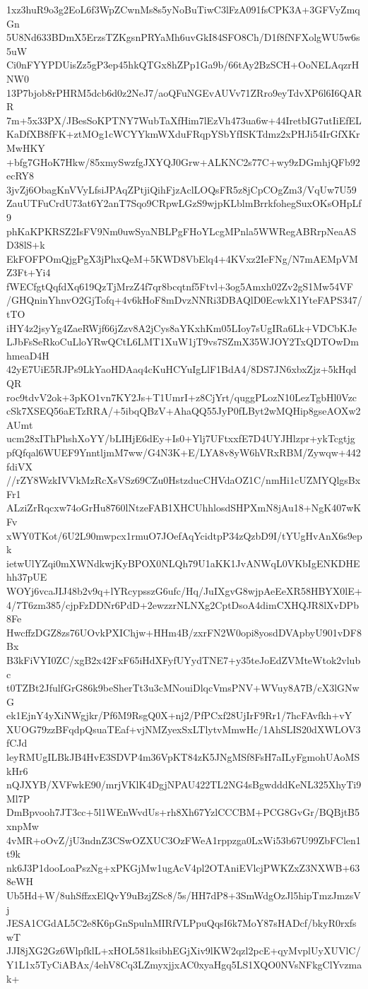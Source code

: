 1xz3huR9o3g2EoL6f3WpZCwnMs8s5yNoBuTiwC3lFzA091fsCPK3A+3GFVyZmqGn
5U8Nd633BDmX5ErzsTZKgsnPRYaMh6uvGkI84SFO8Ch/D1f8fNFXolgWU5w6s5uW
Ci0nFYYPDUisZz5gP3ep45hkQTGx8hZPp1Ga9b/66tAy2BzSCH+OoNELAqzrHNW0
13P7bjob8rPHRM5dcb6d0z2NeJ7/aoQFuNGEvAUVv71ZRro9eyTdvXP6l6I6QARR
7m+5x33PX/JBesSoKPTNY7WubTaXfHim7lEzVh473ua6w+44IretbIG7utIiEfEL
KaDfXB8fFK+ztMOg1cWCYYkmWXduFRqpYSbYfISKTdmz2xPHJi54IrGfXKrMwHKY
+bfg7GHoK7Hkw/85xmySwzfgJXYQJ0Grw+ALKNC2s77C+wy9zDGmhjQFb92ecRY8
3jvZj6ObagKnVVyLfsiJPAqZPtjiQihFjzAclLOQsFR5z8jCpCOgZm3/VqUw7U59
ZauUTFuCrdU73at6Y2anT7Sqo9CRpwLGzS9wjpKLblmBrrkfohegSuxOKsOHpLf9
phKaKPKRSZ2IsFV9Nm0uwSyaNBLPgFHoYLcgMPnla5WWRegABRrpNeaASD38lS+k
EkFOFPOmQjgPgX3jPhxQeM+5KWD8VbElq4+4KVxz2IeFNg/N7mAEMpVMZ3Ft+Yi4
fWECfgtQqfdXq619QzTjMrzZ4f7qr8bcqtnf5Ftvl+3og5Amxh02Zv2gS1Mw54VF
/GHQninYhnvO2GjTofq+4v6kHoF8mDvzNNRi3DBAQlD0EcwkX1YteFAPS347/tTO
iHY4z2jsyYg4ZaeRWjf66jZzv8A2jCys8aYKxhKm05LIoy7sUgIRa6Lk+VDCbKJe
LJbFsSeRkoCuLloYRwQCtL6LMT1XuW1jT9vs7SZmX35WJOY2TxQDTOwDmhmeaD4H
42yE7UiE5RJPs9LkYaoHDAaq4cKuHCYuIgLlF1BdA4/8DS7JN6xbxZjz+5kHqdQR
roc9tdvV2ok+3pKO1vn7KY2Js+T1UmrI+z8CjYrt/quggPLozN10LezTgbHl0Vzc
cSk7XSEQ56aETzRRA/+5ibqQBzV+AhaQQ55JyP0fLByt2wMQHip8gseAOXw2AUmt
ucm28xIThPhshXoYY/bLIHjE6dEy+Is0+Ylj7UFtxxfE7D4UYJHlzpr+ykTcgtjg
pfQfqal6WUEF9YnntljmM7ww/G4N3K+E/LYA8v8yW6hVRxRBM/Zywqw+442fdiVX
//rZY8WzkIVVkMzRcXsVSz69CZu0HstzducCHVdaOZ1C/nmHi1cUZMYQlgsBxFr1
ALziZrRqcxw74oGrHu8760lNtzeFAB1XHCUhhlosdSHPXmN8jAu18+NgK407wKFv
xWY0TKot/6U2L90mwpcx1rmuO7JOefAqYcidtpP34zQzbD9I/tYUgHvAnX6s9epk
ietwUlYZqi0mXWNdkwjKyBPOX0NLQh79U1aKK1JvANWqL0VKbIgENKDHEhh37pUE
WOYj6vcaJIJ48b2v9q+lYRcypsszG6ufc/Hq/JuIXgvG8wjpAeEeXR58HBYX0lE+
4/7T6zm385/cjpFzDDNr6PdD+2ewzzrNLNXg2CptDsoA4dimCXHQJR8lXvDPb8Fe
HwcffzDGZ8zs76UOvkPXIChjw+HHm4B/zxrFN2W0opi8yosdDVApbyU901vDF8Bx
B3kFiVYI0ZC/xgB2x42FxF65iHdXFyfUYydTNE7+y35teJoEdZVMteWtok2vlubc
t0TZBt2JfulfGrG86k9beSherTt3u3cMNouiDlqcVmsPNV+WVuy8A7B/cX3lGNwG
ek1EjnY4yXiNWgjkr/Pf6M9RsgQ0X+nj2/PfPCxf28UjIrF9Rr1/7hcFAvfkh+vY
XUOG79zzBFqdpQsuaTEaf+vjNMZyexSxLTlytvMmwHc/1AhSLIS20dXWLOV3fCJd
leyRMUgILBkJB4HvE3SDVP4m36VpKT84zK5JNgMSf8FsH7aILyFgmohUAoMSkHr6
nQJXYB/XVFwkE90/mrjVKlK4DgjNPAU422TL2NG4sBgwdddKeNL325XhyTi9Ml7P
DmBpvooh7JT3cc+5l1WEnWvdUs+rh8Xh67YzlCCCBM+PCG8GvGr/BQBjtB5xnpMw
4vMR+oOvZ/jU3ndnZ3CSwOZXUC3OzFWeA1rppzga0LxWi53b67U99ZbFClen1t9k
nk6J3P1dooLoaPszNg+xPKGjMw1ugAcV4pl2OTAniEVlcjPWKZxZ3NXWB+638eWH
Ub5Hd+W/8uhSffzxElQvY9uBzjZSc8/5s/HH7dP8+3SmWdgOzJl5hipTmzJmzsVj
JESA1CGdAL5C2e8K6pGnSpulnMIRfVLPpuQqsI6k7MoY87sHADcf/bkyR0rxfswT
JJI8jXG2Gz6WlpfklL+xHOL581ksibhEGjXiv9lKW2qzl2pcE+qyMvplUyXUVlC/
Y1L1x5TyCiABAx/4ehV8Cq3LZmyxjjxAC0xyaHgq5LS1XQO0NVsNFkgClYvzmak+
